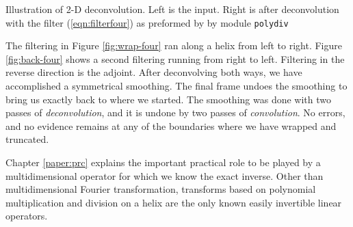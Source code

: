  { 
  Illustration of 2-D deconvolution.
  Left is the input.
  Right is after deconvolution with
  the filter (\protect\ref{eqn:filterfour})
  as preformed by
  by module
  \texttt{polydiv} %
}

The filtering in Figure \ref{fig:wrap-four}
ran along a helix from left to right.
Figure \ref{fig:back-four}
shows a second filtering running from right to left.
Filtering in the reverse direction is the adjoint.
After deconvolving both ways, we have accomplished a symmetrical smoothing.
The final frame undoes the smoothing to bring us exactly back
to where we started.
The smoothing was done with two passes of {\it deconvolution},
and it is undone by two passes of {\it convolution}.
No errors, and no evidence remains at any of the boundaries
where we have wrapped and truncated.


\par
Chapter \ref{paper:prc} explains the important practical role
to be played by a multidimensional operator for which
we know the exact inverse.  
Other than multidimensional Fourier transformation,
transforms based on polynomial multiplication and division
on a helix are the only known easily invertible linear operators.


